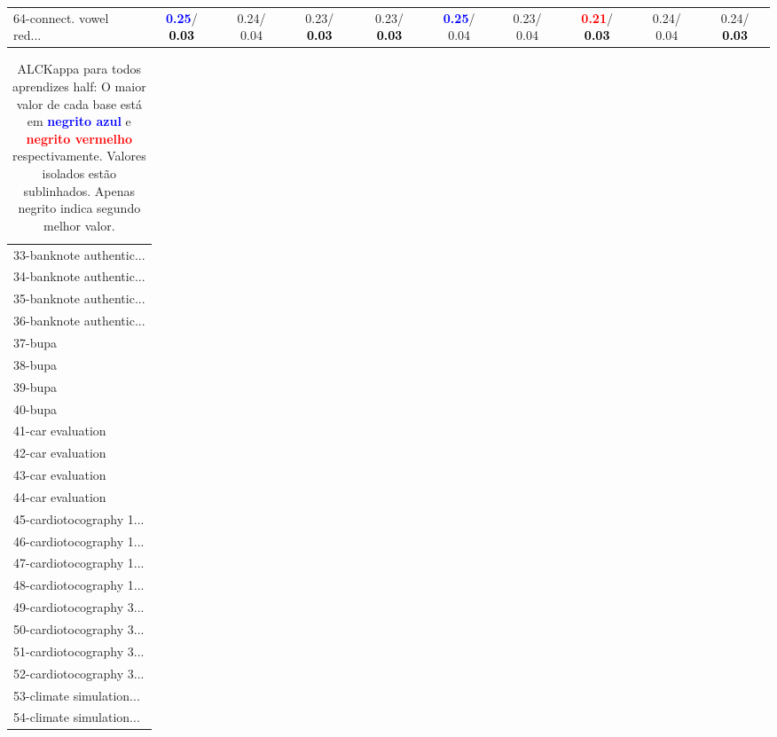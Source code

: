 \begin{table}[h]
\begin{center}
{\begin{tabular}{lc|c|c|c|c|c|c|c|c}
64-connect. vowel red... & \textcolor{blue}{\textbf{  0.25}}/\textcolor{black}{\textbf{  0.03}} &   0.24/  0.04 &   0.23/\textcolor{black}{\textbf{  0.03}} &   0.23/\textcolor{black}{\textbf{  0.03}} & \textcolor{blue}{\textbf{  0.25}}/  0.04 &   0.23/  0.04 & \textcolor{red}{\textbf{  0.21}}/\textcolor{black}{\textbf{  0.03}} &   0.24/  0.04 &   0.24/\textcolor{black}{\textbf{  0.03}} \\\end{tabular}}\label{stratsALCKappa1AllReduxhalfa}
\end{center}
\end{table}
\begin{table}[h]
\caption{ALCKappa para todos aprendizes half: O maior valor de cada base está em \textcolor{blue}{\textbf{negrito azul}} e \textcolor{red}{\textbf{negrito vermelho}} respectivamente. Valores isolados estão sublinhados. Apenas negrito indica segundo melhor valor.}
\begin{center}\begin{tabular}{l}
 & \\ \hline 33-banknote authentic... &  \\
34-banknote authentic... &  \\
35-banknote authentic... &  \\
36-banknote authentic... &  \\
37-bupa &  \\
38-bupa &  \\
39-bupa &  \\ \hline
40-bupa &  \\
41-car evaluation &  \\
42-car evaluation &  \\
43-car evaluation &  \\
44-car evaluation &  \\
45-cardiotocography 1... &  \\
46-cardiotocography 1... &  \\ \hline
47-cardiotocography 1... &  \\
48-cardiotocography 1... &  \\
49-cardiotocography 3... &  \\
50-cardiotocography 3... &  \\
51-cardiotocography 3... &  \\
52-cardiotocography 3... &  \\
53-climate simulation... &  \\ \hline
54-climate simulation... &  \\

\end{tabular}
\end{center}
\end{table}
